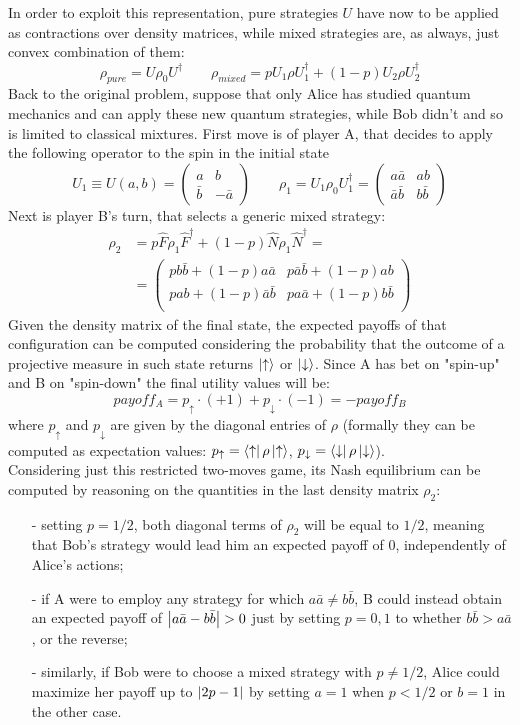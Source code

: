 In order to exploit this representation, pure strategies $U$ have now to be applied as contractions over density matrices, while mixed strategies are, as always, just convex combination of them:
\[ \rho_{pure} = U\rho_0U^\dagger \qquad \rho_{mixed}=pU_1\rho U_1^\dagger+(1-p)U_2\rho U_2^\dagger \]
Back to the original problem, suppose that only Alice has studied quantum mechanics and can apply these new quantum strategies, while Bob didn't and so is limited to classical mixtures. First move is of player A, that decides to apply the following operator to the spin in the initial state
\[ U_1 \equiv U(a,b) = \begin{pmatrix} a&b\\\bar{b}&-\bar{a}\end{pmatrix} \qquad \rho_1 = U_1\rho_0U_1^\dagger = \begin{pmatrix} a\bar{a}&ab\\\bar{a}\bar{b}&b\bar{b}\end{pmatrix} \]
Next is player B's turn, that selects a generic mixed strategy:
\[ \begin{aligned} \rho_2 &= p\hat{F}\rho_1\hat{F}^\dagger + (1-p)\hat{N}\rho_1\hat{N}^\dagger =\\
&= \begin{pmatrix} pb\bar{b}+(1-p)a\bar{a}&p\bar{a}\bar{b}+(1-p)ab\\ pab +(1-p)\bar{a}\bar{b}&pa\bar{a}+(1-p)b\bar{b}\\ \end{pmatrix} \end{aligned} \]
Given the density matrix of the final state, the expected payoffs of that configuration can be computed considering the probability that the outcome of a projective measure in such state returns $\ket{\uparrow}$ or $\ket{\downarrow}$. Since A has bet on "spin-up" and B on "spin-down" the final utility values will be:
\[ payoff_A = p_\uparrow\cdot(+1) + p_\downarrow\cdot(-1) = -payoff_B \]
where $p_\uparrow$ and $p_\downarrow$ are given by the diagonal entries of $\rho$ (formally they can be computed as expectation values: $p_\uparrow=\bra{\uparrow}\rho\ket{\uparrow}$, $p_\downarrow=\bra{\downarrow}\rho\ket{\downarrow}$).\\
Considering just this restricted two-moves game, its Nash equilibrium can be computed by reasoning on the quantities in the last density matrix $\rho_2$:
\begin{itemize}[noitemsep]
	\item[-] setting $p=1/2$, both diagonal terms of $\rho_2$ will be equal to $1/2$, meaning that Bob's strategy would lead him an expected payoff of 0, independently of Alice's actions;
	\item[-] if A were to employ any strategy for which $a\bar{a}\neq b\bar{b}$, B could instead obtain an expected payoff of $\abs{a\bar{a}-b\bar{b}}>0$ just by setting $p=0,1$ to whether $b\bar{b}> a\bar{a}$, or the reverse;
	\item[-] similarly, if Bob were to choose a mixed strategy with $p\neq 1/2$, Alice could maximize her payoff up to $\abs{2p-1}$ by setting $a=1$ when $p<1/2$ or $b=1$ in the other case. 
\end{itemize}
